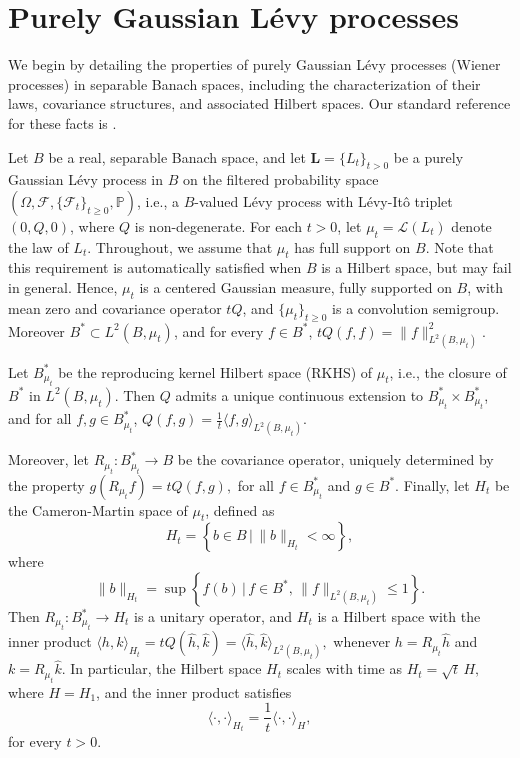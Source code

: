\documentclass[11pt]{amsart}
\theoremstyle{definition}
\theoremstyle{remark}
\numberwithin{equation}{section}
\newcommand{\m}{\mathcal }
\begin{document}
\section{Purely Gaussian L\'evy processes}\label{sec:pureGauss}

We begin by detailing the properties of purely Gaussian L\'evy processes (Wiener processes) in separable Banach spaces, including the characterization of their laws, covariance structures, and associated Hilbert spaces. Our standard reference for these facts is \cite{Bog1}.

Let \( B \) be a real, separable Banach space, and let \( \bm{L} = \{L_t\}_{t > 0} \) be a purely Gaussian L\'evy process in \( B \) on the filtered probability space \((\Omega, \m{F}, \{\m{F}_t\}_{t\geq 0}, \mathbb{P})\), i.e., a \(B\)-valued L\'evy process with L\'evy-It\^o triplet \( (0, Q, 0) \), where \( Q \) is non-degenerate. For each \( t > 0 \), let \( \mu_t = \mathcal{L}(L_t) \) denote the law of \( L_t \). Throughout, we assume that \(\mu_t\) has full support on \(B\). Note that this requirement is automatically satisfied when 
\(B\) is a Hilbert space, but may fail in general. Hence, \( \mu_t \) is a centered Gaussian measure, fully supported on \( B \), with mean zero and covariance operator \( tQ \), and \(\{\mu_t\}_{t\geq 0}\) is a convolution semigroup. Moreover \( B^* \subset L^2(B, \mu_t) \), and for every \( f \in B^* \), \( tQ(f, f) = \|f\|^2_{L^2(B, \mu_t)}.\)
    
 Let \( B^*_{\mu_t} \) be the reproducing kernel Hilbert space (RKHS) of \( \mu_t \), i.e., the closure of \( B^* \) in \( L^2(B, \mu_t) \). Then \( Q \) admits a unique continuous extension to \( B^*_{\mu_t} \times B^*_{\mu_t} \), and for all \( f, g \in B^*_{\mu_t} \), \(Q(f, g) = \frac{1}{t} \langle f, g \rangle_{L^2(B, \mu_t)}.\)
    
Moreover, let \( R_{\mu_t} : B^*_{\mu_t} \to B \) be the covariance operator, uniquely determined by the property \(g(R_{\mu_t} f) = tQ(f, g),\) for all \(f \in B^*_{\mu_t}\) and  \(g \in B^*.\) Finally, let \( H_t \) be the Cameron-Martin space of \( \mu_t \), defined as
    \[
    H_t = \left\{ b \in B \,\Big|\, \|b\|_{H_t} < \infty \right\},
    \]
    where
    \[
    \|b\|_{H_t} = \sup \left\{ f(b) \,\Big|\, f \in B^*, \, \|f\|_{L^2(B, \mu_t)} \leq 1 \right\}.
    \]
    Then \( R_{\mu_t} : B^*_{\mu_t} \to H_t \) is a unitary operator, and \( H_t \) is a Hilbert space with the inner product \(\langle h, k \rangle_{H_t} = tQ(\hat{h}, \hat{k})=\langle \hat{h}, \hat{k} \rangle_{L^2(B, \mu_t)},\) whenever \( h = R_{\mu_t} \hat{h} \) and \( k = R_{\mu_t} \hat{k} \). In particular, the Hilbert space \( H_t \) scales with time as \(H_t = \sqrt{t} \, H,\) where \( H = H_1 \), and the inner product satisfies 
\[
    \langle \cdot, \cdot \rangle_{H_t} = \frac{1}{t} \langle \cdot, \cdot \rangle_{H},
 \]
    for every \( t > 0 \).
\end{document}
